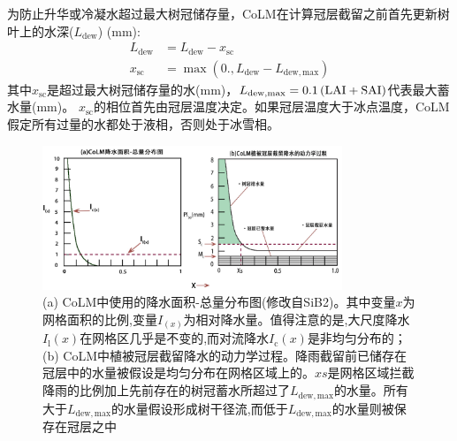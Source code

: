 为防止升华或冷凝水超过最大树冠储存量，CoLM在计算冠层截留之前首先更新树叶上的水深($L_{\mathrm{dew}}$) (mm):
\begin{equation}
  \begin{aligned}
    L_{\mathrm{dew}} &= L_{\mathrm{dew}}-x_{\mathrm{sc}} \\
    x_{\mathrm{sc}} &= \max\left(0., L_{\mathrm{dew}}-L_{\mathrm {dew,max}}\right)
  \end{aligned}
\end{equation}
其中$x_{\mathrm{sc}}$是超过最大树冠储存量的水(mm)，$L_{\mathrm {dew,max}} =0.1\left({\rm LAI}+{\rm SAI}\right)$代表最大蓄水量(mm)。
$x_{\mathrm{sc}}$的相位首先由冠层温度决定。如果冠层温度大于冰点温度，CoLM假定所有过量的水都处于液相，否则处于冰雪相。
{
  \begin{figure}[htbp]
    \centering
    \includegraphics[width=0.8\textwidth]{Figures/植被冠层和土壤水分/CoLM冠层截留示意图.jpg}
    \caption[(a) CoLM中使用的降水面积-总量分布图；(b) CoLM中植被冠层截留降水的动力学过程]{(a) CoLM中使用的降水面积-总量分布图(修改自SiB2)。其中变量$x$为网格面积的比例,变量$I_{\left(x\right)}$为相对降水量。值得注意的是,大尺度降水$I_{\mathrm {l}} \left(x\right)$在网格区几乎是不变的,而对流降水$I_{\mathrm {c}} \left(x\right)$是非均匀分布的；(b) CoLM中植被冠层截留降水的动力学过程。降雨截留前已储存在冠层中的水量被假设是均匀分布在网格区域上的。$xs$是网格区域拦截降雨的比例加上先前存在的树冠蓄水所超过了$L_{\mathrm {dew,max}}$的水量。所有大于$L_{\mathrm {dew,max}}$的水量假设形成树干径流,而低于$L_{\mathrm {dew,max}}$的水量则被保存在冠层之中}
    \label{fig:CoLM冠层截留示意图}
  \end{figure}
}

